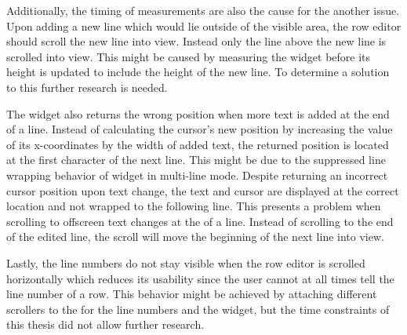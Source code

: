 Additionally, the timing of measurements are also the cause for the another issue. Upon adding a new line which would lie outside of the visible area, the row editor should scroll the new line into view. Instead only the line above the new line is scrolled into view. This might be caused by measuring the  widget before its height is updated to include the height of the new line. To determine a solution to this further research is needed.

The  widget also returns the wrong position when more text is added at the end of a line. Instead of calculating the cursor's new position by increasing the value of its x-coordinates by the width of added text, the returned position is located at the first character of the next line. This might be due to the suppressed line wrapping behavior of  widget in multi-line mode. Despite returning an incorrect cursor position upon text change, the text and cursor are displayed at the correct location and not wrapped to the following line. This presents a problem when scrolling to offscreen text changes at the of a line. Instead of scrolling to the end of the edited line, the scroll will move the beginning of the next line into view.

Lastly, the line numbers do not stay visible when the row editor is scrolled horizontally which reduces its usability since the user cannot at all times tell the line number of a row. This behavior might be achieved by attaching different scrollers to the  for the line numbers and the  widget, but the time constraints of this thesis did not allow further research. 

